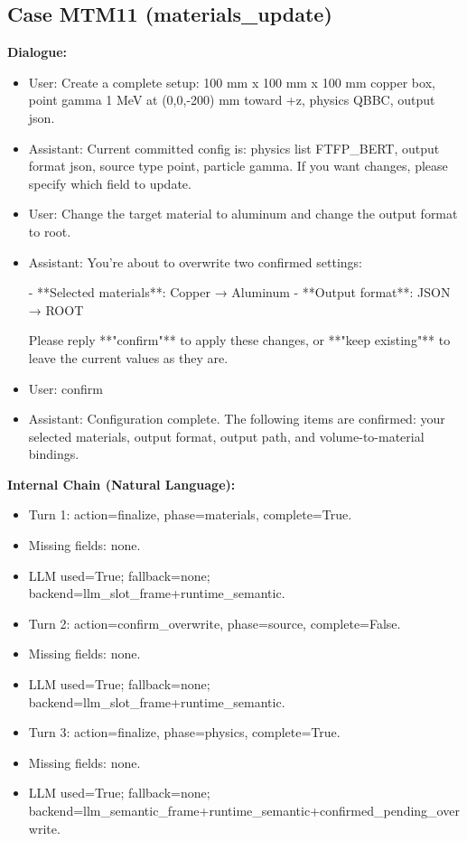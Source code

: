 \documentclass[11pt]{ctexart}
\begin{document}
\subsection{Case MTM11 (materials\_update)}
\textbf{Dialogue:}
\begin{itemize}
\item User: Create a complete setup: 100 mm x 100 mm x 100 mm copper box, point gamma 1 MeV at (0,0,-200) mm toward +z, physics QBBC, output json.
\item Assistant: Current committed config is: physics list FTFP\_BERT, output format json, source type point, particle gamma. If you want changes, please specify which field to update.
\item User: Change the target material to aluminum and change the output format to root.
\item Assistant: You're about to overwrite two confirmed settings:

- **Selected materials**: Copper → Aluminum
- **Output format**: JSON → ROOT

Please reply **"confirm"** to apply these changes, or **"keep existing"** to leave the current values as they are.
\item User: confirm
\item Assistant: Configuration complete. The following items are confirmed: your selected materials, output format, output path, and volume-to-material bindings.
\end{itemize}
\textbf{Internal Chain (Natural Language):}
\begin{itemize}
\item Turn 1: action=finalize, phase=materials, complete=True.
\item Missing fields: none.
\item LLM used=True; fallback=none; backend=llm\_slot\_frame+runtime\_semantic.
\item Turn 2: action=confirm\_overwrite, phase=source, complete=False.
\item Missing fields: none.
\item LLM used=True; fallback=none; backend=llm\_slot\_frame+runtime\_semantic.
\item Turn 3: action=finalize, phase=physics, complete=True.
\item Missing fields: none.
\item LLM used=True; fallback=none; backend=llm\_semantic\_frame+runtime\_semantic+confirmed\_pending\_overwrite.
\end{itemize}
\end{document}
